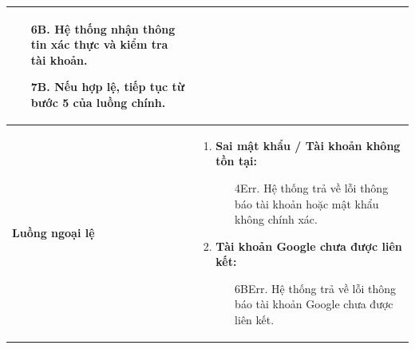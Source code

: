 {\begin{tabularx}{\textwidth}{|>{\raggedright\arraybackslash}X|>{\raggedright\arraybackslash}X|}
\begin{enumerate}
\begin{enumerate}
        \item[6B.] Hệ thống nhận thông tin xác thực và kiểm tra tài khoản.
        \item[7B.] Nếu hợp lệ, tiếp tục từ bước 5 của luồng chính.
    \end{enumerate}
\end{enumerate} \\
\hline
\textbf{Luồng ngoại lệ} &
\begin{enumerate}
    \item \textbf{Sai mật khẩu / Tài khoản không tồn tại:}
    \begin{enumerate}
        \item[4Err.] Hệ thống trả về lỗi thông báo tài khoản hoặc mật khẩu không chính xác.
    \end{enumerate}
    \item \textbf{Tài khoản Google chưa được liên kết:}
    \begin{enumerate}
        \item[6BErr.] Hệ thống trả về lỗi thông báo tài khoản Google chưa được liên kết.
    \end{enumerate}
\end{enumerate} \\
\hline
\end{tabularx}
}
